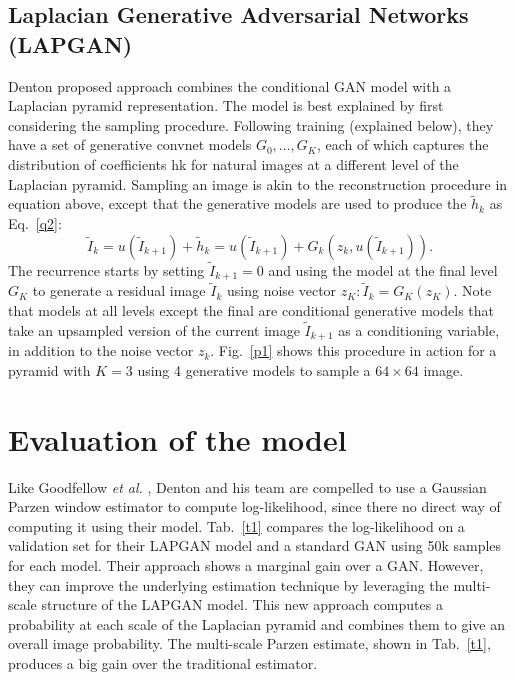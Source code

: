 \documentclass[10pt,twocolumn,letterpaper]{article}
\begin{document}
\subsection{Laplacian Generative Adversarial Networks (LAPGAN)}

Denton proposed approach combines the conditional GAN model with a Laplacian pyramid representation. The model is best explained by first considering the sampling procedure. Following training (explained below), they have a set of generative convnet models ${G_0,\ldots,G_K}$, each of which captures the distribution of coefficients hk for natural images at a different level of the Laplacian pyramid. Sampling an image is akin to the reconstruction procedure in equation above, except that the generative models are used to produce the $\tilde{h}_k$ as Eq.~\ref{q2}:
\begin{equation}
\tilde{I}_k=u(\tilde{I}_{k+1})+\tilde{h}_k=u(\tilde{I}_{k+1})+G_k(z_k,u(\tilde{I}_{k+1})).   \label{q2}
\end{equation}
The recurrence starts by setting $\tilde{I}_{k+1} = 0$ and using the model at the final level $G_K$ to generate a residual image $\tilde{I}_k$ using noise vector $z_K: \tilde{I}_k = G_K(z_K)$. Note that models at all levels except the final are conditional generative models that take an upsampled version of the current image $\tilde{I}_{k+1}$ as a conditioning variable, in addition to the noise vector $z_k$. Fig.~\ref{p1} shows this procedure in action for a pyramid with $K = 3$ using 4 generative models to sample a $64\times 64$ image.

\section{Evaluation of the model}

Like Goodfellow \emph{et al.} \cite{Goodfellow2014Generative}, Denton and his team are compelled to use a Gaussian Parzen window estimator to compute log-likelihood, since there no direct way of computing it using their model. Tab.~\ref{t1} compares the log-likelihood on a validation set for their LAPGAN model and a standard GAN using 50k samples for each model. Their approach shows a marginal gain over a GAN. However, they can improve the underlying estimation technique by leveraging the multi-scale structure of the LAPGAN model. This new approach computes a probability at each scale of the Laplacian pyramid and combines them to give an overall image probability. The multi-scale Parzen estimate, shown in Tab.~\ref{t1}, produces a big gain over the traditional estimator.




{\small


}
\end{document}
